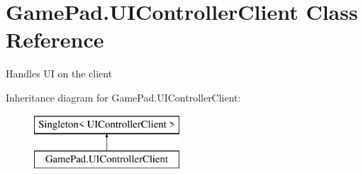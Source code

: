 \hypertarget{class_game_pad_1_1_u_i_controller_client}{}\section{Game\+Pad.\+U\+I\+Controller\+Client Class Reference}
\label{class_game_pad_1_1_u_i_controller_client}


Handles UI on the client  


Inheritance diagram for Game\+Pad.\+U\+I\+Controller\+Client\+:\begin{figure}[H]
\begin{center}
\leavevmode
\includegraphics[height=2.000000cm]{class_game_pad_1_1_u_i_controller_client}
\end{center}
\end{figure}
